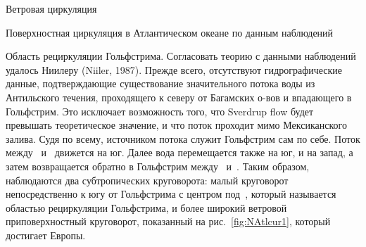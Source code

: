 \begin{chapter}{Ветровая циркуляция}
\begin{section}{Поверхностная циркуляция в Атлантическом океане по данным наблюдений}
\begin{paragraph}{Область рециркуляции Гольфстрима.}
Согласовать теорию с данными наблюдений удалось Ниилеру (Niiler, 1987).
Прежде всего, отсутствуют гидрографические данные, подтверждающие 
существование значительного потока воды из Антильского течения, проходящего
к северу от Багамских о-вов и впадающего в Гольфстрим. Это исключает 
возможность того, что Sverdrup flow будет превышать теоретическое значение,
и что поток проходит мимо Мексиканского залива. Судя по всему, источником 
потока служит Гольфстрим сам по себе. Поток между~ 
и~ движется на юг. Далее вода перемещается также на юг, 
и на запад, а затем возвращается обратно в Гольфстрим между~ 
и~. Таким образом, наблюдаются два субтропических круговорота:
малый круговорот непосредственно к югу от Гольфстрима с центром 
под~, который называется областью рециркуляции Гольфстрима,
и более широкий ветровой приповерхностный круговорот, показанный 
на рис.~\ref{fig:NAtlcur1}, который достигает Европы.
%


\end{paragraph}
\end{section}
\end{chapter}
